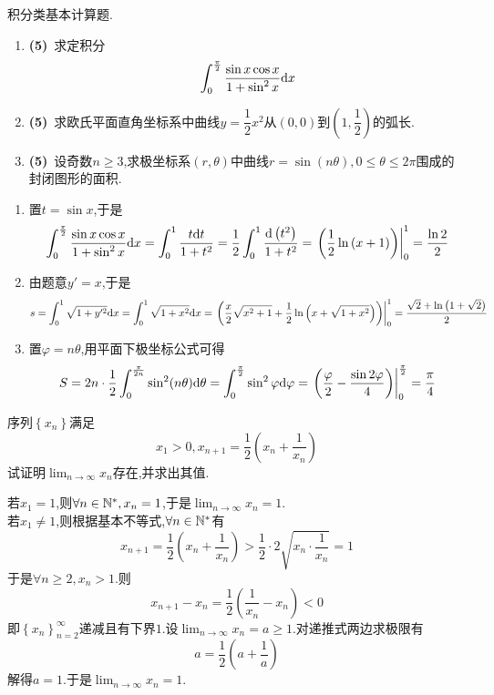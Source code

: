 \documentclass{ctexart}
\begin{document}
\begin{problem}[2.(15\songti{分})]
    积分类基本计算题.
    \begin{enumerate}[label=\textbf{(\arabic*)}]
        \item \textbf{(5)}\ 求定积分$$\int_{0}^{\frac{\pi}{2}}{\dfrac{\sin x\cos x}{1+\sin^2x}\mathrm{d} x}$$
        \item \textbf{(5)}\ 求欧氏平面直角坐标系中曲线$y=\dfrac{1}{2}x^2$从$(0,0)$到$\left(1,\dfrac{1}{2}\right)$的弧长.
        \item \textbf{(5)}\ 设奇数$n\geqslant3$,求极坐标系$(r,\theta)$中曲线$r=\sin(n\theta),0\leqslant\theta\leqslant2\pi$围成的封闭图形的面积.
    \end{enumerate}
\end{problem}
\begin{solution}
    \begin{enumerate}[label=\textbf{(\arabic*)}]
        \item 置$t=\sin x$,于是
            $$\int_{0}^{\frac{\pi}{2}}{\dfrac{\sin x\cos x}{1+\sin^2x}\mathrm{d} x}=\int_0^1\dfrac{t\mathrm{d} t}{1+t^2}=\dfrac{1}{2}\int_0^1\dfrac{\mathrm{d}\left(t^2\right)}{1+t^2}=\left.\left(\dfrac{1}{2}\ln{(x+1)}\right)\right|_0^1=\dfrac{\ln2}{2}$$
        \item 由题意$y'=x$,于是
            $$s=\int_0^1\sqrt{1+y'^2}\mathrm{d} x=\int_0^1\sqrt{1+x^2}\mathrm{d} x=\left.\left(\dfrac{x}{2}\sqrt{x^2+1}+\dfrac{1}{2}\ln\left(x+\sqrt{1+x^2}\right)\right)\right|_0^1=\dfrac{\sqrt{2}+\ln\left(1+\sqrt{2}\right)}{2}$$
        \item 置$\varphi=n\theta$,用平面下极坐标公式可得
            $$S=2n\cdot\dfrac{1}{2}\int_{0}^{\frac{\pi}{2n}}\sin^2(n\theta)\mathrm{d}\theta=\int_{0}^{\frac{\pi}{2}}\sin^2\varphi\mathrm{d}\varphi=\left.\left(\dfrac{\varphi}{2}-\dfrac{\sin2\varphi}{4}\right)\right|_0^{\frac{\pi}{2}}=\dfrac{\pi}{4}$$
    \end{enumerate}
\end{solution}
\begin{problem}[3.(15\songti{分})]
    序列$\left\{x_n\right\}$满足
    $$x_1>0,x_{n+1}=\dfrac{1}{2}\left(x_n+\dfrac{1}{x_n}\right)$$
    试证明$\displaystyle\lim_{n\to\infty}x_n$存在,并求出其值.
\end{problem}
\begin{solution}
    若$x_1=1$,则$\forall n\in\mathbb{N}^*,x_n=1$,于是$\displaystyle\lim_{n\to\infty}x_n=1$.\\
    若$x_1\neq1$,则根据基本不等式,$\forall n\in\mathbb{N}^*$有$$x_{n+1}=\dfrac{1}{2}\left(x_n+\dfrac{1}{x_n}\right)>\dfrac{1}{2}\cdot2\sqrt{x_n\cdot\dfrac{1}{x_n}}=1$$
    于是$\forall n\geqslant2,x_n>1$.则
    $$x_{n+1}-x_n=\dfrac{1}{2}\left(\dfrac{1}{x_n}-x_n\right)<0$$
    即$\left\{x_n\right\}_{n=2}^{\infty}$递减且有下界$1$.设$\displaystyle\lim_{n\to\infty}x_n=a\geqslant1$.对递推式两边求极限有
    $$a=\dfrac{1}{2}\left(a+\dfrac{1}{a}\right)$$
    解得$a=1$.于是$\displaystyle\lim_{n\to\infty}x_n=1$.
\end{solution}
\end{document}
